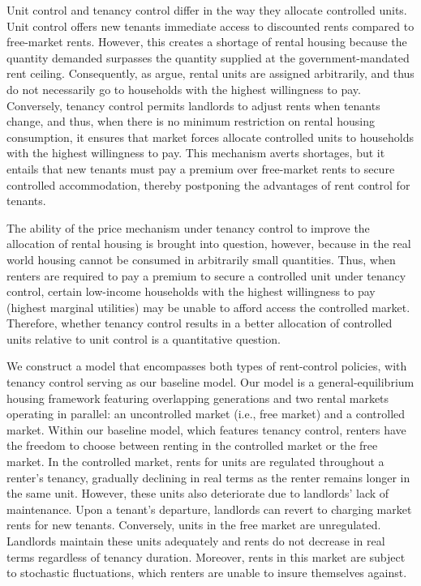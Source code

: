 \documentclass[parskip=full]{article}
\begin{document}
Unit control and tenancy control differ in the way they allocate controlled units. Unit control offers new tenants immediate access to discounted rents compared to free-market rents. However, this creates a shortage of rental housing because the quantity demanded surpasses the quantity supplied at the government-mandated rent ceiling. Consequently, as \citet{gl-2003} argue, rental units are assigned arbitrarily, and thus do not necessarily go to households with the highest willingness to pay. Conversely, tenancy control permits landlords to adjust rents when tenants change, and thus, when there is no minimum restriction on rental housing consumption, it ensures that market forces allocate controlled units to households with the highest willingness to pay. This mechanism averts shortages, but it entails that new tenants must pay a premium over free-market rents to secure controlled accommodation, thereby postponing the advantages of rent control for tenants.

The ability of the price mechanism under tenancy control to improve the allocation of rental housing is brought into question, however, because in the real world housing cannot be consumed in arbitrarily small quantities. Thus, when renters are required to pay a premium to secure a controlled unit under tenancy control, certain low-income households with the highest willingness to pay (highest marginal utilities) may be unable to afford access the controlled market. Therefore, whether tenancy control results in a better allocation of controlled units relative to unit control is a quantitative question.

We construct a model that encompasses both types of rent-control policies, with tenancy control serving as our baseline model. Our model is a general-equilibrium housing framework featuring overlapping generations and two rental markets operating in parallel: an uncontrolled market (i.e., free market) and a controlled market. Within our baseline model, which features tenancy control, renters have the freedom to choose between renting in the controlled market or the free market. In the controlled market, rents for units are regulated throughout a renter's tenancy, gradually declining in real terms as the renter remains longer in the same unit. However, these units also deteriorate due to landlords' lack of maintenance. Upon a tenant's departure, landlords can revert to charging market rents for new tenants. Conversely, units in the free market are unregulated. Landlords maintain these units adequately and rents do not decrease in real terms regardless of tenancy duration. Moreover, rents in this market are subject to stochastic fluctuations, which renters are unable to insure themselves against.
\end{document}
